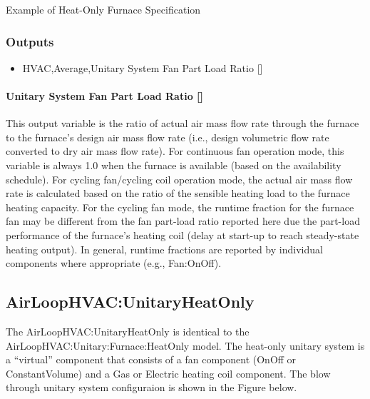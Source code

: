 Example of Heat-Only Furnace Specification

\subsubsection{Outputs}\label{outputs-4-018}

\begin{itemize}
\tightlist
\item
  HVAC,Average,Unitary System Fan Part Load Ratio {[]}
\end{itemize}

\paragraph{Unitary System Fan Part Load Ratio {[]}}\label{unitary-system-fan-part-load-ratio-5}

This output variable is the ratio of actual air mass flow rate through the furnace to the furnace's design air mass flow rate (i.e., design volumetric flow rate converted to dry air mass flow rate). For continuous fan operation mode, this variable is always 1.0 when the furnace is available (based on the availability schedule). For cycling fan/cycling coil operation mode, the actual air mass flow rate is calculated based on the ratio of the sensible heating load to the furnace heating capacity. For the cycling fan mode, the runtime fraction for the furnace fan may be different from the fan part-load ratio reported here due the part-load performance of the furnace's heating coil (delay at start-up to reach steady-state heating output). In general, runtime fractions are reported by individual components where appropriate (e.g., Fan:OnOff).

\subsection{AirLoopHVAC:UnitaryHeatOnly}\label{airloophvacunitaryheatonly}

The AirLoopHVAC:UnitaryHeatOnly is identical to the AirLoopHVAC:Unitary:Furnace:HeatOnly model. The heat-only unitary system is a ``virtual'' component that consists of a fan component (OnOff or ConstantVolume) and a Gas or Electric heating coil component. The blow through unitary system configuraion is shown in the Figure below.

